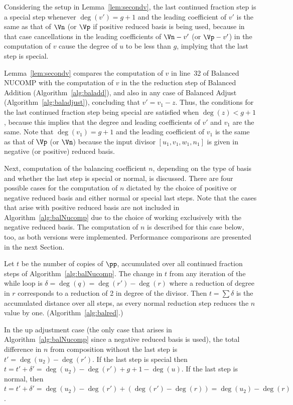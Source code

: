 Considering the setup in Lemma~\ref{lem:secondv}, the last continued fraction
step is a special step whenever $\deg(v') = g+1$ and the leading coefficient of
$v'$ is the same as that of $\Vn$ (or $\Vp$ if positive reduced basis is being
used, because in that case cancellations in the leading coefficients of $\Vn -
v'$ (or $\Vp - v'$) in the computation of $v$ cause the degree of $u$ to be less
than $g$,  implying that the last step is special.

Lemma~\ref{lem:secondv} compares the computation of $v$ in line~32 of Balanced
NUCOMP with the computation of $v$ in the the reduction step of Balanced
Addition (Algorithm~\ref{alg:baladd}), and also in any case of Balanced Adjust
(Algorithm~\ref{alg:baladjust}), concluding that $v' = v_1 - z$.  Thus, the
conditions for the last continued fraction step being special are satisfied when
$\deg(z) < g+1$, because this implies that the degree and leading coefficients
of $v'$ and $v_1$ are the same.  Note that $\deg(v_1) = g+1$ and the leading
coefficient of $v_1$ is the same as that of $\Vp$ (or $\Vn$) because the input
divisor $[u_1,v_1,w_1,n_1]$ is given in negative (or positive) reduced basis.

Next, computation of the balancing coefficient $n$, depending on the type of
basis and whether the last step is special or normal, is discussed. There are
four possible cases for the computation of $n$ dictated by the choice of
positive or negative reduced basis and either normal or special last steps. Note
that the cases that arise with positive reduced basis are not included in
Algorithm~\ref{alg:balNucomp} due to the choice of working exclusively with the
negative reduced basis. The computation of $n$ is described for this case
below, too, as both versions were implemented. Performance comparisons are
presented in the next Section.

Let $t$ be the number of copies of $\pp$, accumulated over all continued
fraction steps of Algorithm~\ref{alg:balNucomp}. The change in $t$ from any
iteration of the while loop is $\delta = \deg(q) = \deg(r') - \deg(r)$ where a
reduction of degree in $r$ corresponds to a reduction of 2 in degree of the
divisor. Then $t = \sum \delta$ is the accumulated distance over all steps, as
every normal reduction step reduces the $n$ value by one.
(Algorithm~\ref{alg:balred}.)

In the up adjustment case (the only case that arises in
Algorithm~\ref{alg:balNucomp} since a negative reduced basis is used), the total
difference in $n$ from composition without the last step is $t' = \deg(u_2) -
\deg(r')$. If the last step is special then $t = t' + \delta' = \deg(u_2) -
\deg(r') + g + 1 - \deg(u)$. If the last step is normal, then $t = t' + \delta'
=   \deg(u_2) - \deg(r') + (\deg(r') - \deg(r)) = \deg(u_2) - \deg(r)$. 

